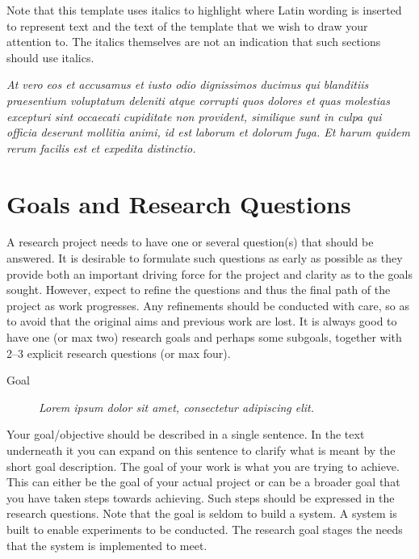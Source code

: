 Note that this template uses italics to highlight where Latin wording is inserted to represent text and the text of the template 
that we wish to draw your attention to. The italics themselves are not an indication that such sections should use italics.  

\textit{At vero eos et accusamus et iusto odio dignissimos ducimus qui blanditiis praesentium voluptatum deleniti atque corrupti quos dolores et quas molestias excepturi sint occaecati cupiditate non provident, similique sunt in culpa qui officia deserunt mollitia animi, id est laborum et dolorum fuga. Et harum quidem rerum facilis est et expedita distinctio.}

\section{Goals and Research Questions}
\label{sec:GoalsandResearchQuestions}

A research project needs to have one or several question(s) that should be answered. 
It is desirable to formulate such questions as early as possible as they provide both an important driving force for the project and clarity as to the goals sought.
However, expect to refine the questions and thus the final path of the project as work progresses.
Any refinements should be conducted with care, so as to avoid that the original aims and previous work are lost.  
It is always good to have one (or max two) research goals and perhaps some subgoals,
together with 2--3 explicit research questions (or max four).

\begin{description}
\item[Goal] \textit{Lorem ipsum dolor sit amet, consectetur adipiscing elit.}
\end{description}

Your goal/objective should be described in a single sentence. 
In the text underneath it you can expand on this sentence to clarify what is meant by the short goal description. 
The goal of your work is what you are trying to achieve. This can either be the goal of your actual project or 
can be a broader goal that you have taken steps towards achieving. Such steps should be expressed in the research questions. 
Note that the goal is seldom to build a system. A system is built to enable experiments to be conducted. 
The research goal stages the needs that the system is implemented to meet.  

